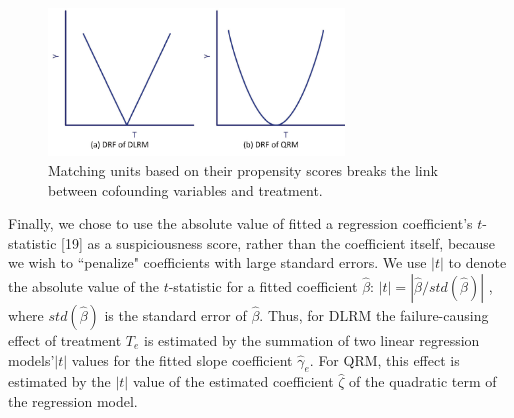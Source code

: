 \begin{figure}[!thpb]
\centering
\includegraphics[width=0.7\textwidth]{chapter3_DRF_curves.pdf}
\caption{Matching units based on their propensity scores breaks the link between cofounding variables and treatment.}
\label{DRF_curves}
\end{figure}
\vspace{-0.1cm}

Finally, we chose to use the absolute value of fitted a regression coefficient's $t$-statistic [19] as a suspiciousness score, rather than the coefficient itself, because we wish to ``penalize" coefficients with large standard errors.  We use $\left| t \right|$ to denote the absolute value of the $t$-statistic for a fitted coefficient $\hat \beta $: $\left| t \right| = |\hat \beta /std ( {\hat \beta })|$ , where $std(\hat \beta)$ is the standard error of $\hat \beta$.  Thus, for DLRM the failure-causing effect of treatment $T_e$ is estimated by the summation of two linear regression models'$\left| t \right|$ values for the fitted slope coefficient ${{\hat \gamma }_e}$.  For QRM, this effect is estimated by the $\left| t \right|$ value of the estimated coefficient ${\hat \zeta }$ of the quadratic term of the regression model.

